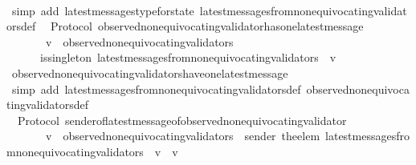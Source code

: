 \begin{isabellebody}
%
\isadelimproof
\ \ %
\endisadelimproof
%
\isatagproof
{}\isamarkupfalse%
\ {\isacharparenleft}simp\ add{\isacharcolon}\ latest{\isacharunderscore}messages{\isacharunderscore}type{\isacharunderscore}for{\isacharunderscore}state\ latest{\isacharunderscore}messages{\isacharunderscore}from{\isacharunderscore}non{\isacharunderscore}equivocating{\isacharunderscore}validators{\isacharunderscore}def{\isacharparenright}%
\endisatagproof
{\isafoldproof}%
%
\isadelimproof
\isanewline
%
\endisadelimproof
\isanewline
\isanewline
{}\isamarkupfalse%
\ {\isacharparenleft}\ Protocol{\isacharparenright}\ observed{\isacharunderscore}non{\isacharunderscore}equivocating{\isacharunderscore}validator{\isacharunderscore}has{\isacharunderscore}one{\isacharunderscore}latest{\isacharunderscore}message\ {\isacharcolon}\isanewline
\ \ {\isachardoublequoteopen}{\isasymforall}\ {\isasymsigma}\ {\isasymin}\ {\isasymSigma}{\isachardot}\ {\isasymforall}\ v\ {\isasymin}\ observed{\isacharunderscore}non{\isacharunderscore}equivocating{\isacharunderscore}validators\ {\isasymsigma}{\isachardot}\isanewline
\ \ \ \ \ \ is{\isacharunderscore}singleton\ {\isacharparenleft}latest{\isacharunderscore}messages{\isacharunderscore}from{\isacharunderscore}non{\isacharunderscore}equivocating{\isacharunderscore}validators\ {\isasymsigma}\ v{\isacharparenright}{\isachardoublequoteclose}\isanewline
%
\isadelimproof
\ \ %
\endisadelimproof
%
\isatagproof
{}\isamarkupfalse%
\ observed{\isacharunderscore}non{\isacharunderscore}equivocating{\isacharunderscore}validators{\isacharunderscore}have{\isacharunderscore}one{\isacharunderscore}latest{\isacharunderscore}message\ \isanewline
\ \ \isamarkupfalse%
\ {\isacharparenleft}simp\ add{\isacharcolon}\ latest{\isacharunderscore}messages{\isacharunderscore}from{\isacharunderscore}non{\isacharunderscore}equivocating{\isacharunderscore}validators{\isacharunderscore}def\ observed{\isacharunderscore}non{\isacharunderscore}equivocating{\isacharunderscore}validators{\isacharunderscore}def{\isacharparenright}%
\endisatagproof
{\isafoldproof}%
%
\isadelimproof
\isanewline
%
\endisadelimproof
\isanewline
\isanewline
{}\isamarkupfalse%
\ {\isacharparenleft}\ Protocol{\isacharparenright}\ sender{\isacharunderscore}of{\isacharunderscore}latest{\isacharunderscore}message{\isacharunderscore}of{\isacharunderscore}observed{\isacharunderscore}non{\isacharunderscore}equivocating{\isacharunderscore}validator{\isacharcolon}\ \isanewline
\ \ {\isachardoublequoteopen}{\isasymforall}\ {\isasymsigma}\ {\isasymin}\ {\isasymSigma}{\isachardot}\ {\isasymforall}\ v\ {\isasymin}\ observed{\isacharunderscore}non{\isacharunderscore}equivocating{\isacharunderscore}validators\ {\isasymsigma}{\isachardot}\ sender\ {\isacharparenleft}the{\isacharunderscore}elem\ {\isacharparenleft}latest{\isacharunderscore}messages{\isacharunderscore}from{\isacharunderscore}non{\isacharunderscore}equivocating{\isacharunderscore}validators\ {\isasymsigma}\ v{\isacharparenright}{\isacharparenright}\ {\isacharequal}\ v{\isachardoublequoteclose}\ \isanewline

\end{isabellebody}
